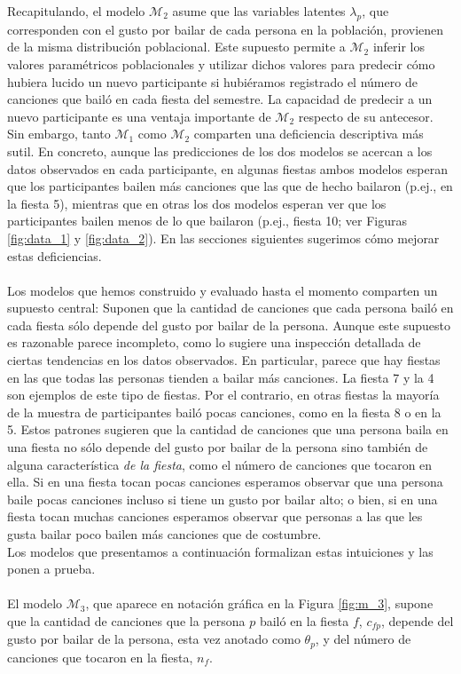 \documentclass{article}
\begin{document}
\indent Recapitulando, el modelo $\mathcal M_2$ asume que las variables latentes $\lambda_p$, que corresponden con el gusto por bailar de cada persona en la población, provienen de la misma distribución poblacional. Este supuesto permite a $\mathcal M_2$ inferir los valores paramétricos poblacionales y utilizar dichos valores para predecir cómo hubiera lucido un nuevo participante si hubiéramos registrado el número de canciones que bailó en cada fiesta del semestre. La capacidad de predecir a un nuevo participante es una ventaja importante de $\mathcal M_2$ respecto de su antecesor.\\
\indent Sin embargo, tanto $\mathcal M_1$ como $\mathcal M_2$ comparten una deficiencia descriptiva más sutil. En concreto, aunque las predicciones de los dos modelos se acercan a los datos observados en cada participante, en algunas fiestas ambos modelos esperan que los participantes bailen más canciones que las que de hecho bailaron (p.ej., en la fiesta 5), mientras que en otras los dos modelos esperan ver que los participantes bailen menos de lo que bailaron (p.ej., fiesta 10; ver Figuras \ref{fig:data_1} y \ref{fig:data_2}). En las secciones siguientes sugerimos cómo mejorar estas deficiencias.\\\\
\indent Los modelos que hemos construido y evaluado hasta el momento comparten un supuesto central: Suponen que la cantidad de canciones que cada persona bailó en cada fiesta sólo depende del gusto por bailar de la persona. Aunque este supuesto es razonable parece incompleto, como lo sugiere una inspección detallada de ciertas tendencias en los datos observados. En particular, parece que hay fiestas en las que todas las personas tienden a bailar más canciones. La fiesta 7 y la 4 son ejemplos de este tipo de fiestas. Por el contrario, en otras fiestas la mayoría de la muestra de participantes bailó pocas canciones, como en la fiesta 8 o en la 5. Estos patrones sugieren que la cantidad de canciones que una persona baila en una fiesta no sólo depende del gusto por bailar de la persona sino también de alguna característica \emph{de la fiesta}, como el número de canciones que tocaron en ella. Si en una fiesta tocan pocas canciones esperamos observar que una persona baile pocas canciones incluso si tiene un gusto por bailar alto; o bien, si en una fiesta tocan muchas canciones esperamos observar que personas a las que les gusta bailar poco bailen más canciones que de costumbre.\\
\indent Los modelos que presentamos a continuación formalizan estas intuiciones y las ponen a prueba.\\\\
\indent El modelo $\mathcal M_3$, que aparece en notación gráfica en la Figura \ref{fig:m_3}, supone que la cantidad de canciones que la persona $p$ bailó en la fiesta $f$, $c_{fp}$, depende del gusto por bailar de la persona, esta vez anotado como $\theta_p$, y del número de canciones que tocaron en la fiesta, $n_f$.
\end{document}

